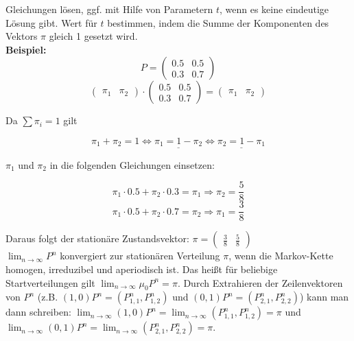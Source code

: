 Gleichungen lösen, ggf. mit Hilfe von Parametern \(t\), wenn es keine eindeutige Lösung gibt. Wert für \(t\) bestimmen, indem die Summe der Komponenten des Vektors \(\pi\) gleich 1 gesetzt wird.\\

\textbf{Beispiel:}
\begin{equation*}
    P = \begin{pmatrix}
        0.5 & 0.5\\
        0.3 & 0.7
    \end{pmatrix}
\end{equation*}
\begin{equation*}
    \begin{pmatrix}
        \pi_1 & \pi_2
    \end{pmatrix} \cdot \begin{pmatrix}
        0.5 & 0.5\\
        0.3 & 0.7
    \end{pmatrix} = \begin{pmatrix}
        \pi_1 & \pi_2
    \end{pmatrix}
\end{equation*}

Da \(\sum \pi_i=1\) gilt

\begin{equation*}
    \pi_1 + \pi_2 = 1 \Leftrightarrow \underline{\pi_1 = 1 - \pi_2} \Leftrightarrow \underline{\pi_2 = 1 - \pi_1}
\end{equation*}

\(\pi_1\) und \(\pi_2\) in die folgenden Gleichungen einsetzen:

\begin{equation*}
    \pi_1 \cdot 0.5 + \pi_2 \cdot 0.3 = \pi_1 \Longrightarrow \pi_2 = \frac{5}{8}
\end{equation*}
\begin{equation*}
    \pi_1 \cdot 0.5 + \pi_2 \cdot 0.7 = \pi_2 \Longrightarrow \pi_1 = \frac{3}{8}
\end{equation*}

Daraus folgt der stationäre Zustandsvektor: \(\pi = \begin{pmatrix}
    \frac{3}{8} & \frac{5}{8}
\end{pmatrix}\)\\


\(\lim_{n\rightarrow\infty} P^n\) konvergiert zur stationären Verteilung \(\pi\), wenn die Markov-Kette homogen, irreduzibel und aperiodisch ist. Das heißt für beliebige Startverteilungen gilt \(\lim_{n\rightarrow\infty} \mu_0P^n = \pi\). Durch Extrahieren der Zeilenvektoren von \(P^n\) (z.B. \((1,0)P^n=(P^n_{1,1}, P^n_{1,2})\) und \((0,1)P^n=(P^n_{2,1}, P^n_{2,2})\)) kann man dann schreiben: \(\lim_{n\rightarrow\infty} (1,0)P^n = \lim_{n\rightarrow\infty} (P^n_{1,1}, P^n_{1,2}) = \pi\) und \(\lim_{n\rightarrow\infty} (0,1)P^n = \lim_{n\rightarrow\infty} (P^n_{2,1}, P^n_{2,2}) = \pi\).\\

